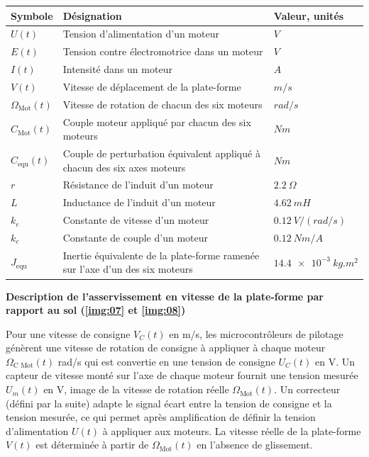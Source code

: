 \begin{center}
\begin{tabular}{lll}
\hline
\textbf{Symbole} & \textbf{Désignation} & \textbf{Valeur, unités} \\  \hline
$U(t)$  			& Tension d’alimentation d’un moteur 		& $\si{V}$ \\ 
$E(t)$ 			& Tension contre électromotrice dans un moteur 	& $\si{V}$ \\ 
$I (t)$			& Intensité dans un moteur 			& $\si{A}$ \\ 
$V(t)$ 			& Vitesse de déplacement de la plate-forme 		& $\si{m/s}$\\ 
$\Omega_{\text{Mot}}(t)$& Vitesse de rotation de chacun des six moteurs	& $\si{rad/s}$ \\
$C_{\text{Mot}}(t)$ 	& Couple moteur appliqué par chacun des six moteurs & $\si{Nm}$ \\ 
$C_{\text{equ}}(t)$ 	& Couple de perturbation équivalent appliqué à chacun des six axes moteurs
& $\si{Nm}$ \\ 
$r$ 			& Résistance de l’induit d’un moteur 		& $\SI{2,2}{\Omega}$ \\ 
$L$ 			& Inductance de l’induit d’un moteur 	& $\SI{4,62}{mH}$ \\ 
$k_e$ 			& Constante de vitesse d’un moteur 	& $\SI{0,12}{V/(rad/s)}$ \\ 
$k_c$ 			& Constante de couple d’un moteur 		& $\SI{0,12}{Nm/A}$ \\ 
$J_{\text{equ}}$		& Inertie équivalente de la plate-forme ramenée sur l’axe d’un des six moteurs
& $\SI{14,4e-3}{kg.m^2}$ \\ \hline
\end{tabular}
\end{center}

\textbf{Description de l’asservissement en vitesse de la plate-forme par rapport au sol (\autoref{img:07} et \autoref{img:08})}

Pour une vitesse de consigne $V_C (t)$ en \si{m/s}, les microcontrôleurs de pilotage génèrent une vitesse de rotation de consigne à appliquer à chaque moteur $\Omega_{\text{C Mot}}(t)$ \si{rad/s} qui est convertie en une tension de consigne $U_C (t)$ en \si{V}. Un capteur de vitesse monté sur l’axe de chaque moteur fournit une tension mesurée $U_m (t)$ en \si{V}, image de la vitesse de rotation réelle $\Omega_{\text{Mot}}(t)$. Un correcteur (défini par la suite) adapte le signal écart entre la tension de consigne et la tension mesurée, ce qui permet après amplification de définir la tension d’alimentation $U(t)$ à appliquer aux moteurs. La vitesse réelle de la plate-forme $V (t)$ est déterminée à partir de $\Omega_{\text{Mot}}(t)$ en l’absence de glissement.

